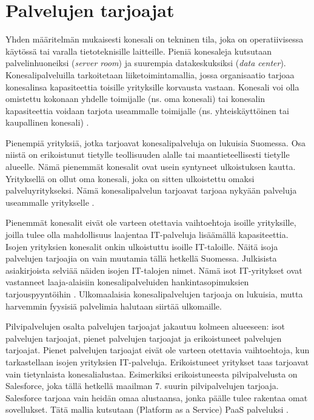 \section{Palvelujen tarjoajat}
Yhden määritelmän mukaisesti konesali on tekninen tila, joka on operatiivisessa käytössä tai varalla tietoteknisille laitteille. Pieniä konesaleja kutsutaan palvelinhuoneiksi (\emph{server room}) ja suurempia datakeskuksiksi (\emph{data center}). Konesalipalveluilla tarkoitetaan liiketoimintamallia, jossa organisaatio tarjoaa konesalinsa kapasiteettia toisille yrityksille korvausta vastaan. Konesali voi olla omistettu kokonaan yhdelle toimijalle (ns. oma konesali) tai konesalin kapasiteettia voidaan tarjota useammalle toimijalle (ns. yhteiskäyttöinen tai kaupallinen konesali) \citep{itewiki}.

Pienempiä yrityksiä, jotka tarjoavat konesalipalveluja on lukuisia Suomessa. Osa niistä on erikoistunut tietylle teollisuuden alalle tai maantieteellisesti tietylle alueelle. Nämä pienemmät konesalit ovat usein syntyneet ulkoistuksen kautta. Yrityksellä on ollut oma konesali, joka on sitten ulkoistettu omaksi palveluyritykseksi. Nämä konesalipalvelun tarjoavat tarjoaa nykyään palveluja useammalle yritykselle \citep{tnnet}.

Pienemmät konesalit eivät ole varteen otettavia vaihtoehtoja isoille yrityksille, joilla tulee olla mahdollisuus laajentaa IT-palveluja lisäämällä kapasiteettia. Isojen yrityksien konesalit onkin ulkoistuttu isoille IT-taloille. Näitä isoja palvelujen tarjoajia on vain muutamia tällä hetkellä Suomessa. Julkisista asiakirjoista selviää näiden isojen IT-talojen nimet. Nämä isot IT-yritykset ovat vastanneet laaja-alaisiin konesalipalveluiden hankintasopimuksien tarjouspyyntöihin \citep{nurmijarvi}. Ulkomaalaisia konesalipalvelujen tarjoaja on lukuisia, mutta harvemmin fyysisiä palvelimia halutaan siirtää ulkomaille.

Pilvipalvelujen osalta palvelujen tarjoajat jakautuu kolmeen alueeseen: isot palvelujen tarjoajat, pienet palvelujen tarjoajat ja erikoistuneet palvelujen tarjoajat. Pienet palvelujen tarjoajat eivät ole varteen otettavia vaihtoehtoja, kun tarkastellaan isojen yrityksien IT-palveluja. Erikoistuneet yritykset taas tarjoavat vain tietynlaista konesalialustaa. Esimerkiksi erikoistuneesta pilvipalvelusta on Salesforce, joka tällä hetkellä maailman 7. suurin pilvipalvelujen tarjoaja. Salesforce tarjoaa vain heidän omaa alustaansa, jonka päälle tulee rakentaa omat sovellukset. Tätä mallia kutsutaan (Platform as a Service) PaaS palveluksi \citep{top_cloud}.


